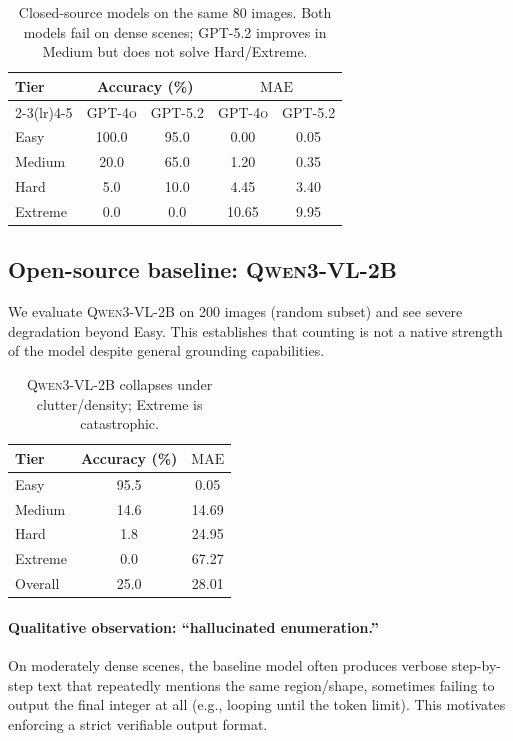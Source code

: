\documentclass[10pt]{article}
\newcommand{\gptfour}{\textsc{GPT-4o}\xspace}
\newcommand{\gptfive}{\textsc{GPT-5.2}\xspace}
\newcommand{\qwenbase}{\textsc{Qwen3-VL-2B}\xspace}
\newcommand{\mae}{\ensuremath{\mathrm{MAE}}\xspace}
\begin{document}
\begin{table}[t]
  \centering
  \small
  \setlength{\tabcolsep}{6pt}
  \begin{tabular}{lcccc}
    \toprule
    \multirow{2}{*}{\textbf{Tier}} & \multicolumn{2}{c}{\textbf{Accuracy (\%)}} & \multicolumn{2}{c}{\textbf{\mae}} \\
    \cmidrule(lr){2-3}\cmidrule(lr){4-5}
     & \gptfour & \gptfive & \gptfour & \gptfive \\
    \midrule
    Easy     & 100.0 & 95.0  & 0.00 & 0.05 \\
    Medium   & 20.0  & 65.0  & 1.20 & 0.35 \\
    Hard     & 5.0   & 10.0  & 4.45 & 3.40 \\
    Extreme  & 0.0   & 0.0   & 10.65 & 9.95 \\
    \bottomrule
  \end{tabular}
  \caption{Closed-source models on the same 80 images. Both models fail on dense scenes; \gptfive improves in Medium but does not solve Hard/Extreme.}
  \label{tab:sota_counting}
\end{table}

\subsection{Open-source baseline: \qwenbase}
We evaluate \qwenbase on 200 images (random subset) and see severe degradation beyond Easy.
This establishes that counting is not a native strength of the model despite general grounding capabilities.

\begin{table}[t]
  \centering
  \small
  \setlength{\tabcolsep}{6pt}
  \begin{tabular}{lcc}
    \toprule
    \textbf{Tier} & \textbf{Accuracy (\%)} & \textbf{\mae} \\
    \midrule
    Easy     & 95.5 & 0.05 \\
    Medium   & 14.6 & 14.69 \\
    Hard     & 1.8  & 24.95 \\
    Extreme  & 0.0  & 67.27 \\
    \midrule
    Overall  & 25.0 & 28.01 \\
    \bottomrule
  \end{tabular}
  \caption{\qwenbase collapses under clutter/density; Extreme is catastrophic.}
  \label{tab:qwen_base}
\end{table}

\paragraph{Qualitative observation: ``hallucinated enumeration.''}
On moderately dense scenes, the baseline model often produces verbose step-by-step text that repeatedly mentions the same region/shape, sometimes failing to output the final integer at all (e.g., looping until the token limit).
This motivates enforcing a strict verifiable output format.
\end{document}
